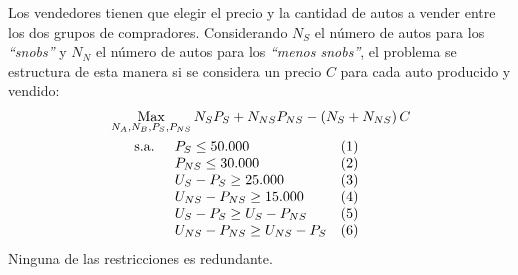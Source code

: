Los vendedores tienen que elegir el precio y la cantidad de autos a vender entre los dos grupos de compradores. Considerando $N_{S}$ el número de autos para los \emph{``snobs''} y $N_{N}$ el número de autos para los \emph{``menos snobs''}, el problema se estructura de esta manera si se considera un precio $C$ para cada auto producido y vendido:
\begin{align*}
	& \operatorname*{Max} \limits_{N_A,N_B,P_S,P_{NS}} N_{S}P_{S}+N_{NS}P_{NS}-\left(N_{S}+N_{N S}\right) C \\
	& \quad \begin{array}{llc}
		\text{ s.a. } & P_{S} \leq 50.000 &  (1)\\
		& P_{N S} \leq 30.000 & (2) \\ 
		& U_{S}-P_{S} \geq 25.000 & (3) \\ 
		& U_{N S}-P_{N S} \geq 15.000 & (4) \\ 
		& U_{S}-P_{S} \geq U_{S}-P_{N S} & (5) \\ 
		& U_{N S}-P_{N S} \geq U_{N S}-P_{S} & (6) \\ 
	\end{array}
\end{align*}
Ninguna de las restricciones es redundante.